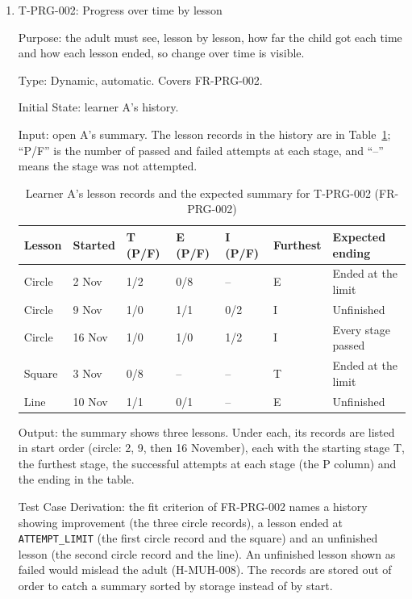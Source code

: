 \documentclass[12pt, titlepage]{article}
\newcommand{\testitem}[1]{\item #1\par\nopagebreak}
\begin{document}
\begin{enumerate}
\testitem{T-PRG-002: Progress over time by lesson}

Purpose: the adult must see, lesson by lesson, how far the child got each
time and how each lesson ended, so change over time is visible.

Type: Dynamic, automatic. Covers FR-PRG-002.

Initial State: learner A's history.

Input: open A's summary. The lesson records in the history are in
Table~\ref{tab:t-prg-002}; ``P/F'' is the number of passed and failed
attempts at each stage, and ``--'' means the stage was not attempted.

\begin{table}[htbp]
\centering\small
\caption{Learner A's lesson records and the expected summary for T-PRG-002
(FR-PRG-002)}
\label{tab:t-prg-002}
\begin{tabularx}{\textwidth}{@{}l l l l l l
  >{\raggedright\arraybackslash}X@{}}
\toprule
\textbf{Lesson} & \textbf{Started} & \textbf{T (P/F)} & \textbf{E (P/F)} &
\textbf{I (P/F)} & \textbf{Furthest} & \textbf{Expected ending}\\
\midrule
Circle & 2 Nov & 1/2 & 0/8 & -- & E & Ended at the limit\\
Circle & 9 Nov & 1/0 & 1/1 & 0/2 & I & Unfinished\\
Circle & 16 Nov & 1/0 & 1/0 & 1/2 & I & Every stage passed\\
Square & 3 Nov & 0/8 & -- & -- & T & Ended at the limit\\
Line & 10 Nov & 1/1 & 0/1 & -- & E & Unfinished\\
\bottomrule
\end{tabularx}
\end{table}

Output: the summary shows three lessons. Under each, its records are listed
in start order (circle: 2, 9, then 16 November), each with the starting stage
T, the furthest stage, the successful attempts at each stage (the P column)
and the ending in the table.

Test Case Derivation: the fit criterion of FR-PRG-002 names a history showing
improvement (the three circle records), a lesson ended at
\texttt{ATTEMPT\_LIMIT} (the first circle record and the square) and an
unfinished lesson (the second circle record and the line). An unfinished
lesson shown as failed would mislead the adult (H-MUH-008). The records are
stored out of order to catch a summary sorted by storage instead of by
start.


\end{enumerate}
\end{document}
